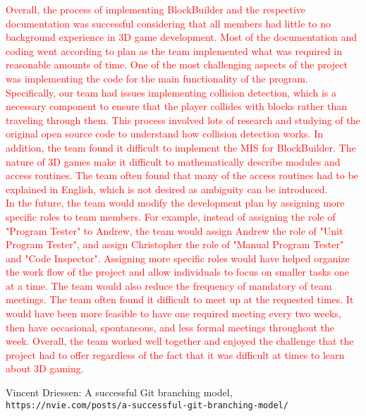 \documentclass{article}
\begin{document}
\textcolor{red}{ Overall, the process of implementing BlockBuilder and the respective documentation was successful considering that all members had little to no background experience in 3D game development. Most of the documentation and coding went according to plan as the team implemented what was required in reasonable amounts of time. One of the most challenging aspects of the project was implementing the code for the main functionality of the program. Specifically, our team had issues implementing collision detection, which is a necessary component to ensure that the player collides with blocks rather than traveling through them. This process involved lots of research and studying of the original open source code to understand how collision detection works. In addition, the team found it difficult to implement the MIS for BlockBuilder. The nature of 3D games make it difficult to mathematically describe modules and access routines. The team often found that many of the access routines had to be explained in English, which is not desired as ambiguity can be introduced.
\medskip
\\
In the future, the team would modify the development plan by assigning more specific roles to team members. For example, instead of assigning the role of "Program Tester" to Andrew, the team would assign Andrew the role of "Unit Program Tester", and assign Christopher the role of "Manual Program Tester" and "Code Inspector". Assigning more specific roles would have helped organize the work flow of the project and allow individuals to focus on smaller tasks one at a time. The team would also reduce the frequency of mandatory of team meetings. The team often found it difficult to meet up at the requested times. It would have been more feasible to have one required meeting every two weeks, then have occasional, spontaneous, and less formal meetings throughout the week. Overall, the team worked well together and enjoyed the challenge that the project had to offer regardless of the fact that it was difficult at times to learn about 3D gaming.}

\medskip

\begin{thebibliography}{9}
Vincent Driessen: A successful Git branching model,
\\\texttt{https://nvie.com/posts/a-successful-git-branching-model/}
\end{thebibliography}
\end{document}
